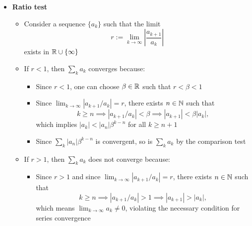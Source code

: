 \documentclass[12pt,a4paper]{article}
\begin{document}
\begin{itemize}
\item \textbf{Ratio test}
  \begin{itemize}
  \item Consider a sequence $\{a_{k}\}$ such that the limit
    \begin{equation}\nonumber%
      r:=\lim_{k\to\infty} \left| \frac{a_{k+1}}{a_{k}} \right|
    \end{equation}
    exists in $\mathbb{R}\cup\{\infty\}$
  \item If $r < 1$, then $\sum_{k}a_{k}$ converges because:
    \begin{itemize}
    \item Since $r<1$, one can choose $\beta\in \mathbb{R}$ such that $r < \beta < 1$
    \item Since $\lim_{k\to\infty}\left|a_{k+1}/a_{k}\right|=r$, there exists $n\in \mathbb{N}$ such that
      \begin{equation}\nonumber%
        k\geq n
        \implies |a_{k+1}/a_{k}| < \beta
        \implies |a_{k+1}| < \beta|a_{k}|,
      \end{equation}
      which implies $|a_{k}|< |a_{n}|\beta^{k-n}$ for all $k\geq n+1$
    \item Since $\sum_{k}|a_{n}|\beta^{k-n}$ is convergent,
      so is $\sum_{k}a_{k}$ by the comparison test
    \end{itemize}
    
  \item If $r > 1$, then $\sum_{k}a_{k}$ does not converge because:
    \begin{itemize}
    \item Since $r>1$ and
      since $\lim_{k\to\infty}\left|a_{k+1}/a_{k}\right|=r$, there exists $n\in \mathbb{N}$ such that
      \begin{equation}\nonumber%
        k\geq n
        \implies |a_{k+1}/a_{k}| > 1
        \implies |a_{k+1}| > |a_{k}|,
      \end{equation}
      which means $\lim_{k\to\infty}a_{k}\neq 0$, violating the necessary condition for series convergence
    \end{itemize}
  \end{itemize}


\end{itemize}
\end{document}
